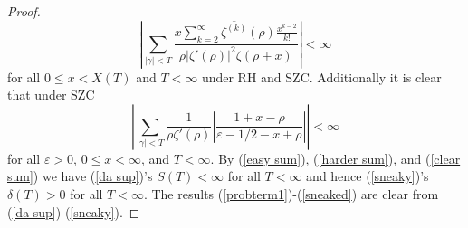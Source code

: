 \documentclass[10pt,a4paper]{amsart}
\begin{document}
\begin{proof}
\begin{equation}
\left|\sum_{\left|\gamma\right|<T}\frac{x\sum_{k=2}^{\infty}\overline{\zeta^{(k)}}(\rho)\frac{x^{k-2}}{k!}}{\rho \left|\zeta'(\rho)\right|^{2}\zeta\left(\bar{\rho}+x\right)}\right|<\infty \label{harder sum}
\end{equation}
for all $0\leq x<X(T)$ and $T<\infty$ under RH and SZC. Additionally it is clear that under SZC 
\begin{equation} 
\left|\sum_{\left|\gamma\right|<T}\frac{1}{\rho\zeta'(\rho)}\left|\frac{1+x-\rho}{\varepsilon-1/2-x+\rho}\right|\right|<\infty \label{clear sum}
\end{equation}
for all $\varepsilon>0$, $0\leq x<\infty$, and $T<\infty$. By (\ref{easy sum}), (\ref{harder sum}), and (\ref{clear sum}) we have (\ref{da sup})'s $S(T)<\infty$ for all $T<\infty$ and hence (\ref{sneaky})'s $\delta(T)>0$ for all $T<\infty$. The results (\ref{probterm1})-(\ref{sneaked}) are clear from (\ref{da sup})-(\ref{sneaky}).
\end{proof}
\end{document}

